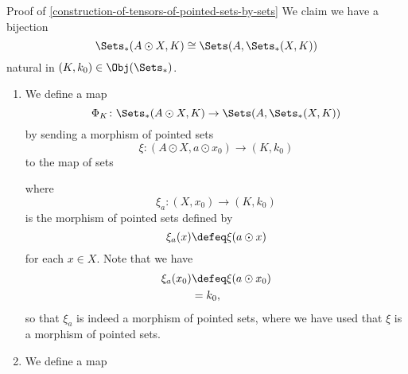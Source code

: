 \begin{Proof}{Proof of \cref{construction-of-tensors-of-pointed-sets-by-sets}}%
    We claim we have a bijection
    \[
        \Sets_{*}(A\odot X,K)%
        \cong%
        \Sets(A,\Sets_{*}(X,K))%
    \]%
    natural in $(K,k_{0})\in\Obj(\Sets_{*})$.%
    \begin{enumerate}
        \item\label{proof-of-construction-of-tensors-of-pointed-sets-by-sets-1}We define a map
            \[
                \Phi_{K}%
                \colon%
                \Sets_{*}(A\odot X,K)
                \to
                \Sets(A,\Sets_{*}(X,K))%
            \]%
            by sending a morphism of pointed sets
            \[
                \xi%
                \colon%
                (A\odot X,a\odot x_{0})%
                \to%
                (K,k_{0})%
            \]%
            to the map of sets%
            \begin{webcompile}
                \phantom{\xi^{\dagger}\colon}
            \end{webcompile}
            where
            \[
                \xi_{a}%
                \colon%
                (X,x_{0})%
                \to%
                (K,k_{0})%
            \]%
            is the morphism of pointed sets defined by
            \[
                \xi_{a}(x)%
                \defeq
                \xi(a\odot x)%
            \]%
            for each $x\in X$. Note that we have
            \begin{align*}
                \xi_{a}(x_{0}) &\defeq \xi(a\odot x_{0})\\%
                               &=      k_{0},%
            \end{align*}
            so that $\xi_{a}$ is indeed a morphism of pointed sets, where we have used that $\xi$ is a morphism of pointed sets.
        \item\label{proof-of-construction-of-tensors-of-pointed-sets-by-sets-2}We define a map

\end{enumerate}
\end{Proof}
